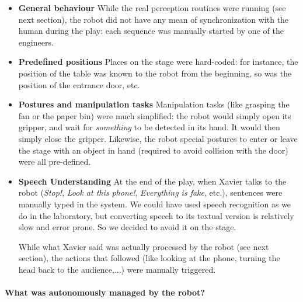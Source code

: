 \begin{itemize}
    \item{\bf General behaviour} While the real perception routines were running
(see next section), the robot did not have any mean of synchronization with the
human during the play: each sequence was manually started by one of the
engineers.

    \item{\bf Predefined positions} Places on the stage were hard-coded: for instance, the position of the table
was known to the robot from the beginning, so was the position of the entrance
door, etc.

    \item{\bf Postures and manipulation tasks} Manipulation tasks (like grasping
the fan or the paper bin) were much simplified: the robot would simply open its
gripper, and wait for \emph{something} to be detected in its hand. It would
then simply close the gripper. Likewise, the robot special postures to enter or
leave the stage with an object in hand (required to avoid collision with the
door) were all pre-defined.

    \item{\bf Speech Understanding} At the end of the play, when Xavier talks to
the robot (\emph{Stop!}, \emph{Look at this phone!}, \emph{Everything is fake},
etc.), sentences were manually typed in the system. We could have used speech
recognition as we do in the laboratory, but converting speech to its textual
version is relatively slow and error prone. So we decided to avoid it on the
stage.

While what Xavier said was actually processed by the robot (see next section),
the actions that followed (like looking at the phone, turning the head back to
the audience,...) were manually triggered.

\end{itemize}

\paragraph{What was autonomously managed by the robot?}

